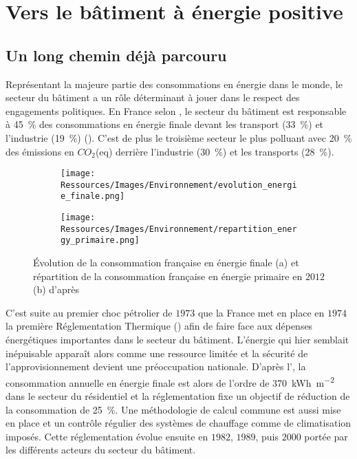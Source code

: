\section{Vers le bâtiment à énergie positive} %
\label{sec:vers_le_batiment_a_energie_positive}
\subsection{Un long chemin déjà parcouru} %
\label{sub:un_long_chemin_deja_parcouru}
Représentant la majeure partie des consommations en énergie dans le monde, le secteur du
bâtiment a un rôle déterminant à jouer dans le respect des engagements politiques. En
France selon \textcite{ADEME2015}, le secteur du bâtiment est responsable à
\SI{45}{\percent} des consommations en énergie finale devant les transport
(\SI{33}{\percent}) et l’industrie (\SI{19}{\percent})
(). C’est de plus le troisième secteur le plus
polluant avec \SI{20}{\percent} des émissions en $CO_{2}$(eq) derrière
l’industrie (\SI{30}{\percent}) et les transports (\SI{28}{\percent}).


\begin{figure}
    \centering
    \begin{subfigure}[b]{0.45\textwidth}
        \texttt{[image: Ressources/Images/Environnement/evolution\_energie\_finale.png]}
        \caption{}
        \label{fig:evolution_energy_finale}
    \end{subfigure}
    \quad
    \begin{subfigure}[b]{0.45\textwidth}
        \texttt{[image: Ressources/Images/Environnement/repartition\_energy\_primaire.png]}
        \caption{}
        \label{fig:repartition_conso_primaire}
    \end{subfigure}
    \caption[Description du secteur énergétique français]
             {Évolution de la consommation française en énergie finale (a) et
              répartition de la consommation française en énergie primaire en $2012$ (b)
              d’après \textcite{ADEME2015}}
    \label{fig:energy_france}
\end{figure}

C’est suite au premier choc pétrolier de $1973$ que la France met en place en $1974$ la première
Réglementation Thermique () afin de faire face aux dépenses énergétiques importantes
dans le secteur du bâtiment. L’énergie qui hier semblait inépuisable apparaît
alors comme une ressource limitée et la sécurité de l’approvisionnement devient une
préoccupation nationale. D’après l’, la consommation annuelle en énergie finale est
alors de l’ordre de \SI{370}{kWh\per\metre\squared} dans le secteur du résidentiel et la
réglementation fixe un objectif de réduction de la consommation de
\SI{25}{\percent}. Une méthodologie de calcul commune est aussi mise en place et
un contrôle régulier des systèmes de chauffage comme de climatisation imposés.
Cette réglementation évolue ensuite en $1982$, $1989$, puis $2000$ portée par
les différents acteurs du secteur du bâtiment.

